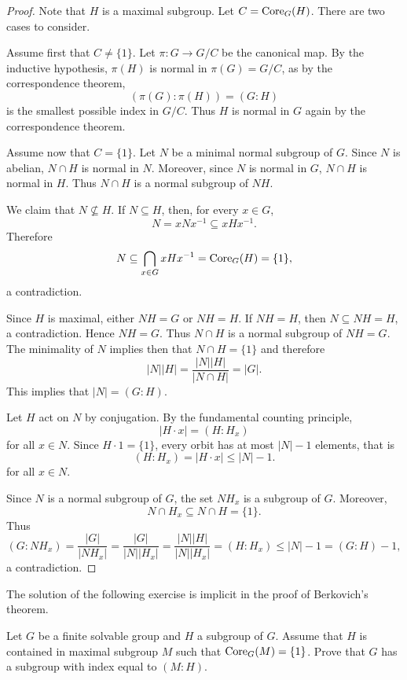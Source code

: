 \begin{proof}
    Note that $H$ is a maximal subgroup. Let $C=\operatorname{Core}_G(H)$. There are two cases to consider. 

    Assume first that $C\ne\{1\}$. Let $\pi\colon G\to G/C$ be the canonical map. 
    By the inductive hypothesis, $\pi(H)$ is normal in $\pi(G)=G/C$, as by the correspondence theorem, 
    \[
    (\pi(G):\pi(H))=(G:H)
    \]
    is the smallest possible index in $G/C$. Thus $H$ is normal in $G$ again by the correspondence theorem. 

    Assume now that $C=\{1\}$. Let $N$ be a minimal normal subgroup of $G$. 
    Since $N$ is abelian, $N\cap H$ is normal in $N$. Moreover, since $N$ is normal in $G$, $N\cap H$ is normal in $H$. Thus $N\cap H$ is a normal subgroup of $NH$. 
    
    We claim that $N\not\subseteq H$. If $N\subseteq H$, 
    then, for every $x\in G$, 
    \[
        N=xNx^{-1}\subseteq xHx^{-1}.
    \]
    Therefore 
    \[
    N\subseteq \bigcap_{x\in G}xHx^{-1}=\operatorname{Core}_G(H)=\{1\},
    \]
    a contradiction. 
    
    Since $H$ is maximal, either $NH=G$ or $NH=H$. If $NH=H$, then
    $N\subseteq NH=H$, a contradiction. Hence $NH=G$. Thus $N\cap H$ is a normal subgroup of $NH=G$. The minimality of $N$ implies then that 
    $N\cap H=\{1\}$ and therefore  
    \[
    |N||H|=\frac{|N||H|}{|N\cap H|}=|G|.
    \]
    This implies that $|N|=(G:H)$. 

    Let $H$ act on $N$ by conjugation. 
    By the fundamental counting principle, 
    \[
    |H\cdot x|=(H:H_x)
    \]
    for all $x\in N$. Since $H\cdot 1=\{1\}$, every orbit 
    has at most $|N|-1$ elements, that is 
    \[
    (H:H_x)=|H\cdot x|\leq |N|-1.
    \]
    for all $x\in N$. 
    
    Since $N$ is a normal subgroup of $G$, the set 
    $NH_x$ is a subgroup of $G$. 
    Moreover, 
    \[
    N\cap H_x\subseteq N\cap H=\{1\}.
    \]
    Thus 
    \[
    (G:NH_x)=\frac{|G|}{|NH_x|}=\frac{|G|}{|N||H_x|}=\frac{|N||H|}{|N||H_x|}=(H:H_x)
    \leq |N|-1=(G:H)-1,
    \]
    a contradiction. 
\end{proof}

The solution of the following exercise is implicit in 
the proof of Berkovich's theorem. 

\begin{exercise}
\label{xca:corefree_maximal}
    Let $G$ be a finite solvable group and $H$ a subgroup of $G$. 
    Assume that $H$ is contained in maximal subgroup $M$ such that $\operatorname{Core}_G(M)=\{1\}$. 
    Prove that $G$ has a subgroup with index equal to $(M:H)$. 
\end{exercise}
